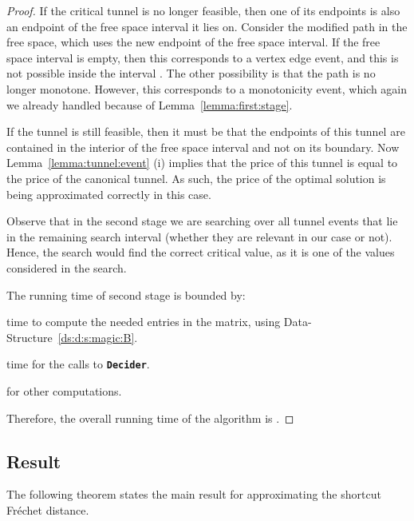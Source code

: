 \documentclass[12pt]{article}
\makeatletter
\newcommand{\AlgorithmI}[1]{{\textcolor[named]{RedViolet}{\texttt{\bf{#1}}}}}
\newcommand{\Algorithm}[1]{{\AlgorithmI{#1}\index{algorithm!#1@{\AlgorithmI{#1}}}}}
\newcommand{\lemref}[1]{Lemma~\ref{lemma:#1}}
\newcommand{\dsref}[1]{Data-Structure~\ref{ds:#1}}
\newcommand{\Frechet}{Fr\'{e}c{h}e{}t\xspace}\providecommand{\Arr}{\mathop{\mathrm{\EuScript{A}}}}
\newcommand{\DeciderFr}{\Algorithm{Decider}\xspace}
\newcommand{\tunnel}{tunnel\xspace}
\numberwithin{figure}{section}
\numberwithin{equation}{section}
\makeatother
\begin{document}
\begin{proof}
    If the critical tunnel is no longer feasible, then one of its
    endpoints is also an endpoint of the free space interval it lies
    on. Consider the modified path in the free space, which uses the
    new endpoint of the free space interval.  If the free space
    interval is empty, then this corresponds to a vertex edge event,
    and this is not possible inside the interval .
    The other possibility is that the path is no longer
    monotone. However, this corresponds to a monotonicity event, which
    again we already handled because of \lemref{first:stage}.
    
    If the tunnel is still feasible, then it must be that the
    endpoints of this \tunnel are contained in the interior of the
    free space interval and not on its boundary.  Now
    \lemref{tunnel:event} (i) implies that the price of this \tunnel
    is equal to the price of the canonical tunnel.  As such, the price
    of the optimal solution is being approximated correctly in this
    case.
    
    
    
    
    Observe that in the second stage we are searching over all tunnel
    events that lie in the remaining search interval (whether they are
    relevant in our case or not).  Hence, the search would find the
    correct critical value, as it is one of the values considered in
    the search.
    
    The running time of second stage is bounded by:
    \begin{compactenum}[(A)]
        \item  time to compute the needed
        entries in the matrix, using \dsref{d:s:magic:B}.
        
        \item  time for the
         calls to \DeciderFr.
        
        \item  for other computations.
    \end{compactenum}
    
    Therefore, the overall running time of the algorithm is .
\end{proof}




\subsection{Result}

The following theorem states the main result for approximating the
shortcut \Frechet distance.
\end{document}
